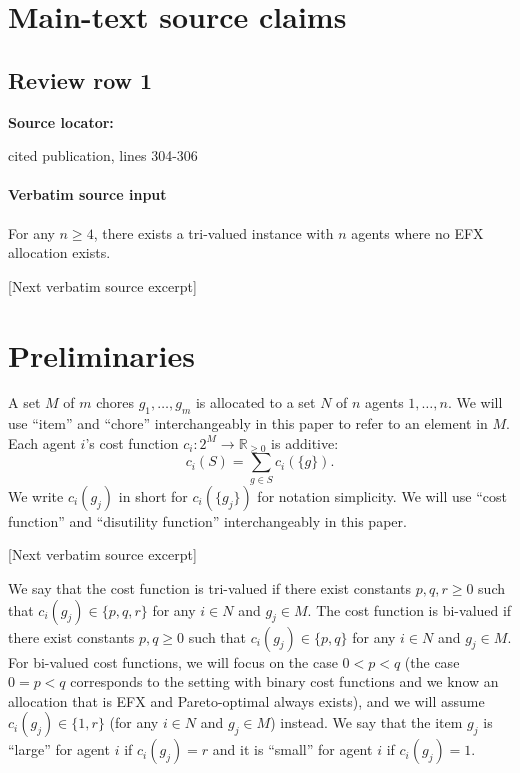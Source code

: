 \documentclass[10pt]{article}
\begin{document}
\clearpage
\hypertarget{source-claim-707062c38758c055}{}
\hypertarget{source-section-0c7af8265958a9ea}{}
\section*{Main-text source claims}
\subsection*{Review row 1}
\textbf{Source locator:} {\footnotesize\raggedright cited publication, lines 304-\allowbreak{}306\par}
\paragraph{Verbatim source input}
\begin{ReviewVerbatim}
\begin{theorem}\label{thm:tri}
    For any $n\geq 4$, there exists a tri-valued instance with $n$ agents where no EFX allocation exists.
\end{theorem}

[Next verbatim source excerpt]

\section{Preliminaries}
A set $M$ of $m$ chores $g_1,\ldots,g_m$ is allocated to a set $N$ of $n$ agents $1,\ldots,n$.
We will use ``item'' and ``chore'' interchangeably in this paper to refer to an element in $M$.
Each agent $i$'s cost function $c_i:2^M\to\mathbb{R}_{\geq0}$ is additive:
$$c_i(S)=\sum_{g\in S}c_i(\{g\}).$$
We write $c_i(g_j)$ in short for $c_i(\{g_j\})$ for notation simplicity.
We will use ``cost function'' and ``disutility function'' interchangeably in this paper.

[Next verbatim source excerpt]

We say that the cost function is tri-valued if there exist constants $p,q,r\geq 0$ such that $c_i(g_j)\in\{p,q,r\}$ for any $i\in N$ and $g_j\in M$.
The cost function is bi-valued if there exist constants $p,q\geq 0$ such that $c_i(g_j)\in\{p,q\}$ for any $i\in N$ and $g_j\in M$.
For bi-valued cost functions, we will focus on the case $0<p<q$ (the case $0=p<q$ corresponds to the setting with binary cost functions and we know an allocation that is EFX and Pareto-optimal always exists), and we will assume $c_i(g_j)\in\{1,r\}$ (for any $i\in N$ and $g_j\in M$) instead.
We say that the item $g_j$ is ``large'' for agent $i$ if $c_i(g_j)=r$ and it is ``small'' for agent $i$ if $c_i(g_j)=1$.
\end{ReviewVerbatim}
\end{document}
